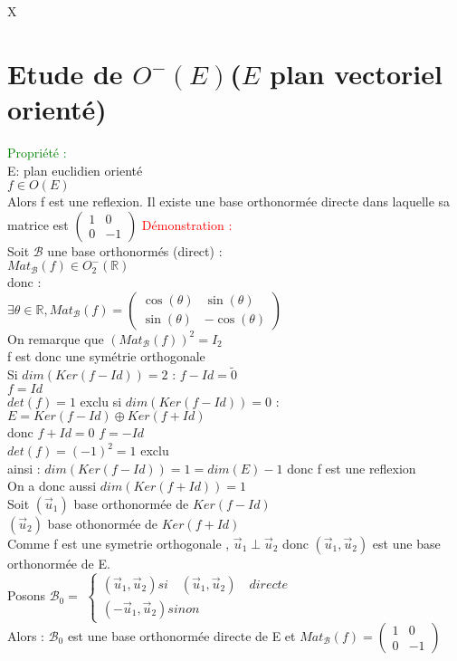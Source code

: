 X\documentclass{article}
\begin{document}
\section{Etude de $O^-(E)$($E$ plan vectoriel orienté)}
\textcolor{green}{Propriété :} \\
E: plan euclidien orienté \\
$f \in O(E)$ \\
Alors f est une reflexion. Il existe une base orthonormée directe dans laquelle sa matrice est $\begin{pmatrix}
1 & 0 \\
0 & -1
\end{pmatrix}$
\textcolor{red}{Démonstration :} \\
Soit $\mathcal B$ une base orthonormés (direct) : \\
$Mat_{\mathcal B}(f) \in O_2^-(\mathbb R)$ \\
donc : \\
$\exists \theta \in \mathbb R, Mat_{\mathcal B}(f)=\begin{pmatrix}
\cos(\theta) & \sin(\theta) \\
\sin(\theta) & - \cos(\theta)
\end{pmatrix}$ \\
On remarque que $(Mat_{\mathcal B}(f))^2=I_2$ \\
f est donc une symétrie orthogonale \\
Si $dim(Ker(f-Id))=2$ : $f-Id=\tilde 0$ \\
$f=Id$ \\
$det(f)=1$ exclu
si $dim(Ker(f-Id))=0$ :
$E=Ker(f-Id) \oplus Ker(f+Id)$ \\
donc $f+Id=0$ $f=-Id$ \\
$det(f)=(-1)^2=1$ exclu \\
ainsi : $dim(Ker(f-Id))=1=dim(E)-1$ donc f est une reflexion \\
On a donc aussi $dim(Ker(f+Id))=1$ \\
Soit $(\vec u_1)$ base orthonormée de $Ker(f-Id)$ \\
$(\vec u_2)$ base othonormée de $Ker(f+Id)$ \\
Comme f est une symetrie orthogonale , $\vec u_1 \perp \vec u_2$ donc $(\vec u_1,\vec u_2)$ est une base orthonormée de E. \\
Posons $\mathcal B_0=$ $ \left\{\begin{array}{l}
( \vec u_1,\vec u_2) si \quad  (\vec u_1,\vec u_2)  \quad  directe \\
(- \vec u_1,\vec u_2) sinon
\end{array}$ \\ 
Alors : $\mathcal B_0$ est une base orthonormée directe de E et $Mat_{\mathcal B}(f)=\begin{pmatrix}
1 & 0 \\
0 & -1
\end{pmatrix}$
\end{document}
